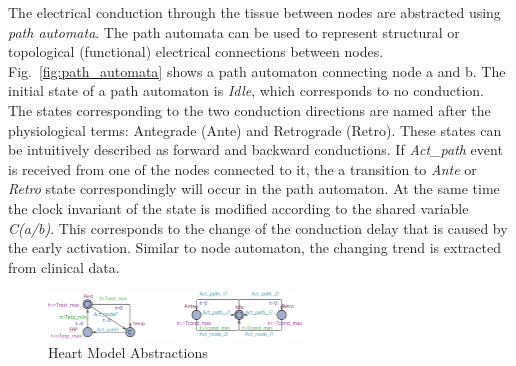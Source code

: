 \documentclass{llncs}
\newcommand{\figref}[1]{Fig.~\ref{fig:#1}}
\begin{document}
The electrical conduction through the tissue between nodes are abstracted using \emph{path automata}. The path automata can be used to represent structural or topological (functional) electrical connections between nodes. \figref{path_automata} shows a path automaton connecting node a and b. The initial state of a path automaton is \emph{Idle}, which corresponds to no conduction. The states corresponding to the two conduction directions are named after the physiological terms: Antegrade (Ante) and Retrograde (Retro). These states can be intuitively described as forward and backward conductions. If \emph{Act\_path} event is received from one of the nodes connected to it, the a transition to \emph{Ante} or \emph{Retro} state correspondingly will occur in the path automaton. At the same time the clock invariant of the state is modified according to the shared variable \emph{C(a/b)}. This corresponds to the change of the conduction delay that is caused by the early activation. Similar to node automaton, the changing trend is extracted from clinical data. 
\begin{figure}[!t]
		\centering
		\includegraphics[width=0.6\textwidth]{figs/init_abs.png}
		\caption{\small Heart Model Abstractions}
		\label{fig:init}
\end{figure}
\end{document}
